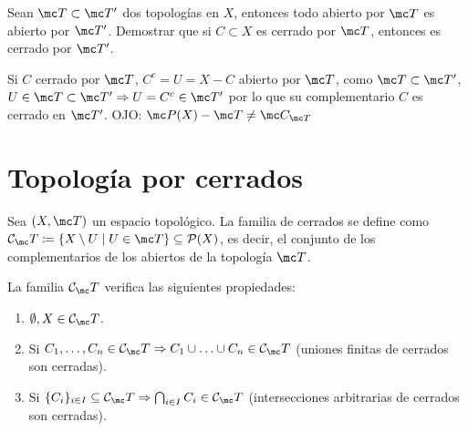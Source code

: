 \begin{ejer}
    Sean $\mc T \subset \mc T'$ dos topolog\'ias en $X$, entonces todo abierto por $\mc T$ es abierto por $\mc T'$. Demostrar que si $C \subset X$ es cerrado por $\mc T$, entonces es cerrado por $\mc T'$. 
\end{ejer}
\begin{sol}
Si $C$ cerrado por $\mc T$, $C^c = U= X-C$ abierto por $\mc T$, como $\mc T \subset \mc T'$, $U \in \mc T \subset \mc T' \Rightarrow U = C^c \in \mc T'$ por lo que su complementario $C$ es cerrado en $\mc T'$.  OJO: $\mc P(X) - \mc T \neq \mc C_{\mc T}$
\end{sol}
\section{Topología por cerrados}

Sea \((X, \mc T)\) un espacio topológico. La familia de cerrados se define como \(\mathcal{C}_\mc T \coloneqq \{X \setminus U \mid U \in \mc T\} \subseteq \mathcal{P}(X)\), es decir, el conjunto de los complementarios de los abiertos de la topología $\mc T$.

\begin{prop}
La familia \(\mathcal{C}_\mc T\) verifica las siguientes propiedades:
\begin{enumerate}
    \item[\textbf{1)}] \(\emptyset, X \in \mathcal{C}_\mc T\).
    \item[\textbf{2)}] Si \(C_1, \ldots, C_n \in \mathcal{C}_\mc T \Rightarrow C_1 \cup \ldots \cup C_n \in \mathcal{C}_\mc T\) (uniones finitas de cerrados son cerradas).
    \item[\textbf{3)}] Si \(\{C_i\}_{i \in I} \subseteq \mathcal{C}_\mc T \Rightarrow \bigcap_{i \in I} C_i \in \mathcal{C}_\mc T\) (intersecciones arbitrarias de cerrados son cerradas).
\end{enumerate}
\end{prop}

